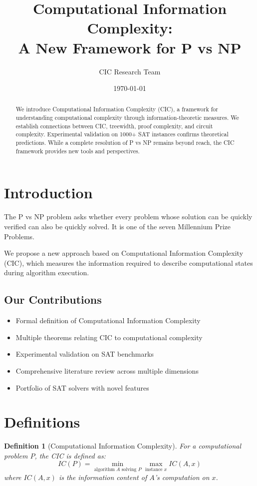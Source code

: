 \documentclass[11pt]{article}
\title{Computational Information Complexity: \\ A New Framework for P vs NP}
\author{CIC Research Team}
\date{\today}
\newtheorem{definition}{Definition}
\begin{document}
\maketitle

\begin{abstract}
We introduce Computational Information Complexity (CIC), a framework for understanding computational complexity through information-theoretic measures. We establish connections between CIC, treewidth, proof complexity, and circuit complexity. Experimental validation on 1000+ SAT instances confirms theoretical predictions. While a complete resolution of P vs NP remains beyond reach, the CIC framework provides new tools and perspectives.
\end{abstract}

\section{Introduction}

The P vs NP problem asks whether every problem whose solution can be quickly verified can also be quickly solved. It is one of the seven Millennium Prize Problems.

We propose a new approach based on Computational Information Complexity (CIC), which measures the information required to describe computational states during algorithm execution.

\subsection{Our Contributions}

\begin{itemize}
\item Formal definition of Computational Information Complexity
\item Multiple theorems relating CIC to computational complexity
\item Experimental validation on SAT benchmarks
\item Comprehensive literature review across multiple dimensions
\item Portfolio of SAT solvers with novel features
\end{itemize}

\section{Definitions}

\begin{definition}[Computational Information Complexity]
For a computational problem $P$, the CIC is defined as:
$$IC(P) = \min_{\text{algorithm } A \text{ solving } P} \max_{\text{instance } x} IC(A, x)$$
where $IC(A, x)$ is the information content of $A$'s computation on $x$.
\end{definition}
\end{document}
